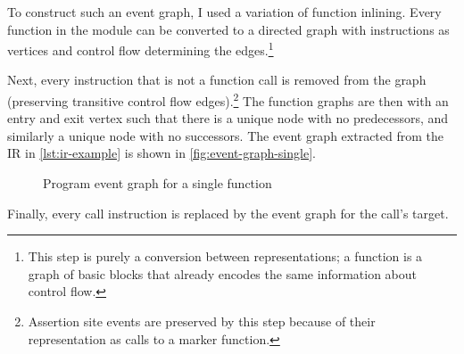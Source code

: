 To construct such an event graph, I used a variation of function
inlining. Every function in the module can be converted to a directed graph
with instructions as vertices and control flow determining the
edges.\footnote{This step is purely a conversion between representations; a
function is a graph of basic blocks that already encodes the same information
about control flow.}

Next, every instruction that is not a function call is removed from the graph
(preserving transitive control flow edges).\footnote{Assertion site events are
preserved by this step because of their representation as calls to a marker
function.} The function graphs are then  with an entry and
exit vertex such that there is a unique node with no predecessors, and similarly
a unique node with no successors. The event graph extracted from the IR in
\autoref{lst:ir-example} is shown in \autoref{fig:event-graph-single}.

\begin{figure}[ht]
  \centering
  \caption{Program event graph for a single function}
  \label{fig:event-graph-single}
\end{figure}

Finally, every call instruction is replaced by the event graph for the call's
target.
